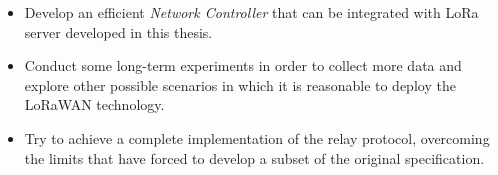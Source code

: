 \begin{itemize}
\item Develop an efficient \emph{Network Controller} that can be integrated with LoRa server developed in this thesis.

\item Conduct some long-term experiments in order to collect more data and explore other possible scenarios in which it is reasonable to deploy the LoRaWAN technology.

\item Try to achieve a complete implementation of the relay protocol, overcoming the limits that have forced to develop a subset of the original specification.
\end{itemize}